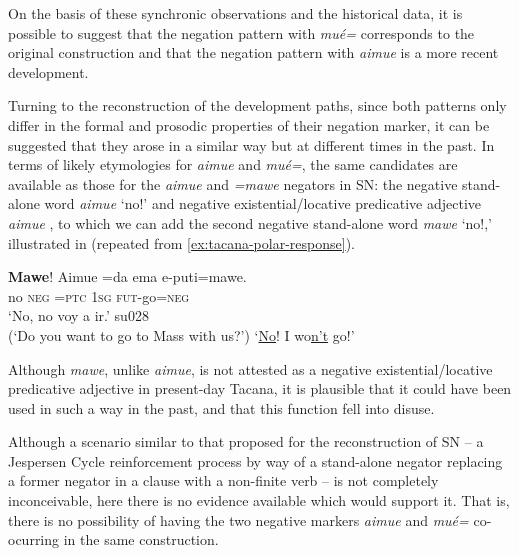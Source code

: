 \documentclass[output=paper]{langsci/langscibook}
\begin{document}
On the basis of these synchronic observations and the historical data, it is possible to suggest that the negation pattern with \textit{mué=} corresponds to the original construction and that the negation pattern with \textit{aimue} is a more recent development.

Turning to the reconstruction of the development paths, since both patterns
only differ in the formal and prosodic properties of their negation marker,
it can be suggested that they arose in a similar way but at different
times in the past. In terms of likely etymologies for \textit{aimue} and
\textit{mué=}, the same candidates are available as those for the
\textit{aimue} and \textit{=mawe} negators in SN: the negative stand-alone
word \textit{aimue} `no!'  and negative
existential\slash locative predicative adjective \textit{aimue}
, to which we can add the second negative
stand-alone word \textit{mawe} `no!,' illustrated in
 (repeated from \ref{ex:tacana-polar-response}).
%
\begin{exe}\ex\label{ex:tacana-not-to-mass}
\gll \textbf{Mawe}!  Aimue  =da  ema  e-puti=mawe.\\
    no  \textsc{neg}  \textsc{=ptc}  \textsc{1sg}
    \textsc{fut}-go=\textsc{neg}\\
\glt `No, no voy a ir.' su028\\
(`Do you want to go to Mass with us?') `\uline{No}! I wo\uline{n't} go!'
\end{exe}
%
Although \textit{mawe}, unlike \textit{aimue}, is not attested as a negative existential\slash locative predicative adjective in present-day Tacana, it is plausible that it could have been used in such a way in the past, and that this function fell into disuse.

Although a scenario similar to that proposed for the reconstruction of
SN -- a Jespersen Cycle reinforcement process by way of a stand-alone
negator replacing a former negator in a clause with a non-finite verb -- is
not completely inconceivable, here there is no evidence available which
would support it. That is, there is no possibility of having the two
negative markers \textit{aimue} and \textit{mué=} co-ocurring in the same
construction.
\end{document}
